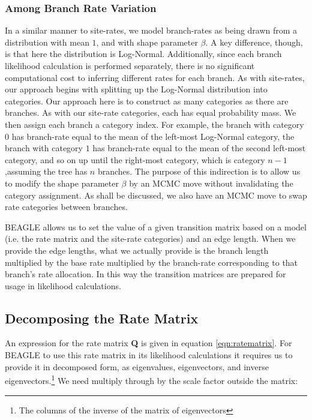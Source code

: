 \documentclass[10pt,journal,compsoc]{IEEEtran}
\begin{document}
\subsubsection{Among Branch Rate Variation}

In a similar manner to site-rates, we model branch-rates as being drawn from a distribution with mean $1$, and with shape parameter $\beta$. A key difference, though, is that here the distribution is Log-Normal. Additionally, since each branch likelihood calculation is performed separately, there is no significant computational cost to inferring different rates for each branch. As with site-rates, our approach begins with splitting up the Log-Normal distribution into categories. Our approach here is to construct as many categories as there are branches. As with our site-rate categories, each has equal probability mass. We then assign each branch a category index. For example, the branch with category $0$ has branch-rate equal to the mean of the left-most Log-Normal category, the branch with category $1$ has branch-rate equal to the mean of the second left-most category, and so on up until the right-most category, which is category $n - 1$,assuming the tree has $n$ branches. The purpose of this indirection is to allow us to modify the shape parameter $\beta$ by an MCMC move without invalidating the category assignment. As shall be discussed, we also have an MCMC move to swap rate categories between branches.

BEAGLE allows us to set the value of a given transition matrix based on a model (i.e. the rate matrix and the site-rate categories) and an edge length. When we provide the edge lengths, what we actually provide is the branch length multiplied by the base rate multiplied by the branch-rate corresponding to that branch's rate allocation. In this way the transition matrices are prepared for usage in likelihood calculations.

\subsection{Decomposing the Rate Matrix}

An expression for the rate matrix \textbf{Q} is given in equation \eqref{eqn:ratematrix}. For BEAGLE to use this rate matrix in its likelihood calculations it requires us to provide it in decomposed form, as eigenvalues, eigenvectors, and inverse eigenvectors.\footnote{The columns of the inverse of the matrix of eigenvectors} We need multiply through by the scale factor outside the matrix:
\end{document}
